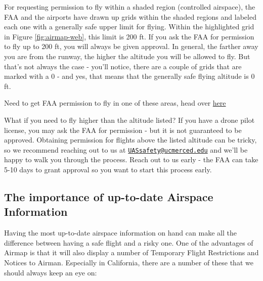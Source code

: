 \documentclass[
  12pt,
]{book}
\newenvironment{notebox}{
  \definecolor{shadecolor}{gray}{.8}  %
  \color{black}
  \begin{shaded}}
 {\end{shaded}}
\begin{document}
For requesting permission to fly within a shaded region (controlled airspace), the FAA and the airports have drawn up grids within the shaded regions and labeled each one with a generally safe upper limit for flying. Within the highlighted grid in Figure \ref{fig:airmap-web}, this limit is 200 ft. If you ask the FAA for permission to fly up to 200 ft, you will always be given approval. In general, the farther away you are from the runway, the higher the altitude you will be allowed to fly. But that's not always the case - you'll notice, there are a couple of grids that are marked with a 0 - and yes, that means that the generally safe flying altitude is 0 ft.

\begin{notebox}
Need to get FAA permission to fly in one of these areas, head over \protect\hyperlink{LAANC}{here}

\end{notebox}

What if you need to fly higher than the altitude listed? If you have a drone pilot license, you may ask the FAA for permission - but it is not guaranteed to be approved. Obtaining permission for flights above the listed altitude can be tricky, so we recommend reaching out to us at \href{mailto:UASsafety@ucmerced.edu}{\nolinkurl{UASsafety@ucmerced.edu}} and we'll be happy to walk you through the process. Reach out to us early - the FAA can take 5-10 days to grant approval so you want to start this process early.

\hypertarget{the-importance-of-up-to-date-airspace-information}{%
\subsection{The importance of up-to-date Airspace Information}\label{the-importance-of-up-to-date-airspace-information}}

Having the most up-to-date airspace information on hand can make all the difference between having a safe flight and a risky one. One of the advantages of Airmap is that it will also display a number of Temporary Flight Restrictions and Notices to Airman. Especially in California, there are a number of these that we should always keep an eye on:
\end{document}
